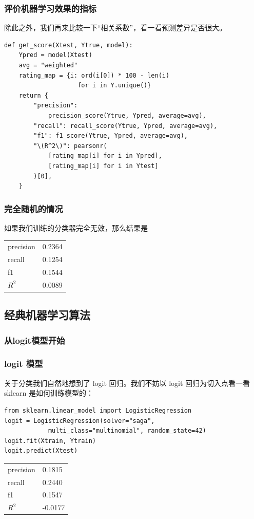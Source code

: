 \documentclass{ctexbeamer}
\begin{document}
\begin{frame}[fragile]
    \frametitle{评价机器学习效果的指标}
    除此之外，我们再来比较一下“相关系数”，看一看预测差异是否很大。
    \begin{verbatim}
def get_score(Xtest, Ytrue, model):
    Ypred = model(Xtest)
    avg = "weighted"
    rating_map = {i: ord(i[0]) * 100 - len(i)
                    for i in Y.unique()}
    return {
        "precision":
            precision_score(Ytrue, Ypred, average=avg),
        "recall": recall_score(Ytrue, Ypred, average=avg),
        "f1": f1_score(Ytrue, Ypred, average=avg),
        "\(R^2\)": pearsonr(
            [rating_map[i] for i in Ypred],
            [rating_map[i] for i in Ytest]
        )[0],
    }
\end{verbatim}
\end{frame}
\begin{frame}
    \frametitle{完全随机的情况}
    如果我们训练的分类器完全无效，那么结果是
    \begin{center}
        \begin{tabular}{ll}
            precision & 0.2364 \\
            recall    & 0.1254 \\
            f1        & 0.1544 \\
            \(R^2\)   & 0.0089 \\
        \end{tabular}
    \end{center}
\end{frame}
\subsection{经典机器学习算法}
\subsubsection{从logit模型开始}
\begin{frame}[fragile]
    \frametitle{logit 模型}
    关于分类我们自然地想到了 logit 回归。我们不妨以 logit 回归为切入点看一看 sklearn 是如何训练模型的：

    \begin{verbatim}
from sklearn.linear_model import LogisticRegression
logit = LogisticRegression(solver="saga", 
            multi_class="multinomial", random_state=42)
logit.fit(Xtrain, Ytrain)
logit.predict(Xtest)
    \end{verbatim}

    \begin{center}
        \begin{tabular}{ll}
            precision & 0.1815  \\
            recall    & 0.2440  \\
            f1        & 0.1547  \\
            \(R^2\)   & -0.0177 \\
        \end{tabular}
    \end{center}
\end{frame}
\end{document}

